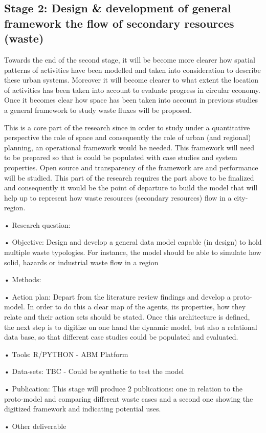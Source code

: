 \subsection{Stage 2: Design \& development of general framework the flow of secondary resources (waste)}
Towards the end of the second stage, it will be become more clearer how spatial patterns of activities have been modelled and taken into consideration to describe these urban systems. Moreover it will become clearer to what extent the location of activities has been taken into account to evaluate progress in circular economy.
Once it becomes clear how space has been taken into account in previous studies a general framework to study waste fluxes will be proposed.\par
This is a core part of the research since in order to study under a quantitative perspective the role of space and consequently the role of urban (and regional) planning, an operational framework would be needed. This framework will need to be prepared so that is could be populated with case studies and system properties. Open source and transparency of the framework are and performance will be studied. This part of the research requires the part above to be finalized and consequently it would be the point of departure to build the model that will help up to represent how waste resources (secondary resources) flow in a city-region.\par
•	Research question: \par
•	Objective: Design and develop a general data model capable (in design) to hold multiple waste typologies. For instance, the model should be able to simulate how solid, hazards or industrial waste flow in a region    \par
•	Methods: \par
•	Action plan: Depart from the literature review findings and develop a proto-model. In order to do this a clear map of the agents, its properties, how they relate and their action sets should be stated. Once this architecture is defined, the next step is to digitize on one hand the dynamic model, but also a relational data base, so that different case studies could be populated and evaluated.  \par
•	Tools: R/PYTHON - ABM Platform \par
•	Data-sets: TBC - Could be synthetic to test the model \par
•	Publication: This stage will produce 2 publications: one in relation to the proto-model and comparing different waste cases and a second one showing the digitized framework and indicating potential uses. \par
•	Other deliverable \par



